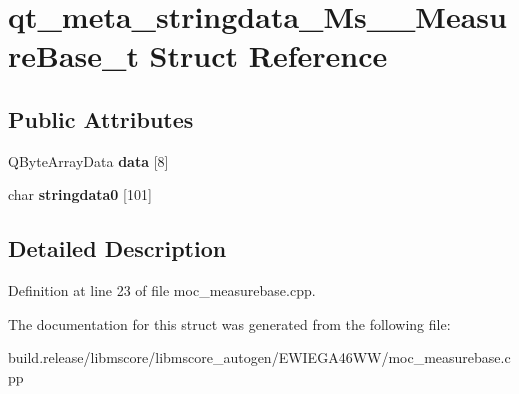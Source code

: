 \hypertarget{structqt__meta__stringdata___ms_____measure_base__t}{}\section{qt\+\_\+meta\+\_\+stringdata\+\_\+\+Ms\+\_\+\+\_\+\+Measure\+Base\+\_\+t Struct Reference}
\label{structqt__meta__stringdata___ms_____measure_base__t}
\subsection*{Public Attributes}
\begin{DoxyCompactItemize}
\item 
\mbox{\label{structqt__meta__stringdata___ms_____measure_base__t_ab0ea92951432c3050f07da05fc03c08e}} 
Q\+Byte\+Array\+Data {\bfseries data} \mbox{[}8\mbox{]}
\item 
\mbox{\label{structqt__meta__stringdata___ms_____measure_base__t_a52f6190b017cdb5ab67074bb76aaaed4}} 
char {\bfseries stringdata0} \mbox{[}101\mbox{]}
\end{DoxyCompactItemize}


\subsection{Detailed Description}


Definition at line 23 of file moc\+\_\+measurebase.\+cpp.



The documentation for this struct was generated from the following file\+:\begin{DoxyCompactItemize}
\item 
build.\+release/libmscore/libmscore\+\_\+autogen/\+E\+W\+I\+E\+G\+A46\+W\+W/moc\+\_\+measurebase.\+cpp\end{DoxyCompactItemize}
